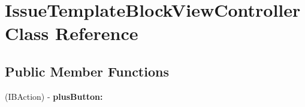 \hypertarget{interface_issue_template_block_view_controller}{
\section{IssueTemplateBlockViewController Class Reference}
\label{interface_issue_template_block_view_controller}
}
\subsection*{Public Member Functions}
\begin{DoxyCompactItemize}
\item 
\hypertarget{interface_issue_template_block_view_controller_a0857b5a97ab5b6de72574644501927ea}{
(IBAction) -\/ {\bfseries plusButton:}}
\label{interface_issue_template_block_view_controller_a0857b5a97ab5b6de72574644501927ea}

\end{DoxyCompactItemize}
